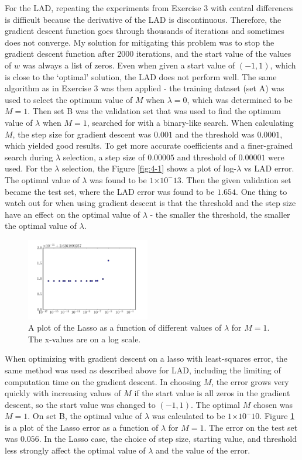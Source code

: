 \documentclass[10pt]{article}
\providecommand{\e}[1]{\ensuremath{\times 10^{#1}}}
\begin{document}
For the LAD, repeating the experiments from Exercise 3 with central differences is difficult because the derivative of the LAD is discontinuous. Therefore, the gradient descent function goes through thousands of iterations and sometimes does not converge. My solution for mitigating this problem was to stop the gradient descent function after 2000 iterations, and the start value of the values of $w$ was always a list of zeros. Even when given a start value of $(-1, 1)$, which is close to the `optimal' solution, the LAD does not perform well. The same algorithm as in Exercise 3 was then applied - the training dataset (set A) was used to select the optimum value of $M$ when $\lambda = 0$, which was determined to be $M = 1$. Then set B was the validation set that was used to find the optimum value of $\lambda$ when $M = 1$, searched for with a binary-like search. When calculating $M$, the step size for gradient descent was $0.001$ and the threshold was $0.0001$, which yielded good results. To get more accurate coefficients and a finer-grained search during $\lambda$ selection, a step size of $0.00005$ and threshold of $0.00001$ were used. For the $\lambda$ selection, the  Figure \ref{fig:4-1} shows a plot of log-$\lambda$ vs LAD error. The optimal value of $\lambda$ was found to be $1\e-13$. Then the given validation set became the test set, where the LAD error was found to be $1.654$. One thing to watch out for when using gradient descent is that the threshold and the step size have an effect on the optimal value of $\lambda$ - the smaller the threshold, the smaller the optimal value of $\lambda$. 

\begin{figure}[!ht]
	\begin{center}
	\includegraphics[width=0.48\textwidth]{exercise4-2.pdf}
	\caption{A plot of the Lasso as a function of different values of $\lambda$ for $M = 1$. The x-values are on a log scale.}
	\label{fig:4-2}
	\end{center}
\end{figure}

When optimizing with gradient descent on a lasso with least-squares error, the same method was used as described above for LAD, including the limiting of computation time on the gradient descent. In choosing $M$, the error grows very quickly with increasing values of $M$ if the start value is all zeros in the gradient descent, so the start value was changed to $(-1, 1)$. The optimal $M$ chosen was $M = 1$. On set B, the optimal value of $\lambda$ was calculated to be $1\e-10$. Figure \ref{fig:4-2} is a plot of the Lasso error as a function of $\lambda$ for $M = 1$. The error on the test set was $0.056$. In the Lasso case, the choice of step size, starting value, and threshold less strongly affect the optimal value of $\lambda$ and the value of the error. 
\end{document}
